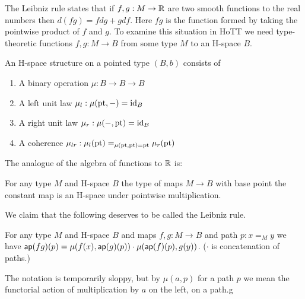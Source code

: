 \documentclass[12pt]{article}
\begin{document}
The Leibniz rule states that if \( f, g:M\to \mathbb{R} \) are two smooth functions to the real numbers then \( d(fg) = fdg + gdf \). Here \( fg \) is the function formed by taking the pointwise product of \( f \) and \( g \). To examine this situation in HoTT we need type-theoretic functions \( f, g:M\to B \) from some type \( M \) to an H-space \( B \).

\begin{mydef}
An H-space structure on a pointed type \( (B,b) \) consists of
\begin{enumerate}
\item A binary operation \( \mu:B\to B\to B \)
\item A left unit law \( \mu_l:\mu(\mathrm{pt},-)=\text{id}_B \)
\item A right unit law \( \mu_r:\mu(-,\mathrm{pt})=\text{id}_B \)
\item A coherence \( \mu_{lr}:\mu_l(\mathrm{pt})=_{\mu(\mathrm{pt},\mathrm{pt})=\mathrm{pt}}\mu_r(\mathrm{pt}) \)
\end{enumerate}
\end{mydef}

The analogue of the algebra of functions to \( \mathbb{R} \) is:
\begin{myprop}
For any type \( M \) and H-space \( B \) the type of maps \( M\to B \) with base point the constant map is an H-space under pointwise multiplication.
\end{myprop}

We claim that the following deserves to be called the Leibniz rule.

\begin{mylemma}
For any type \( M \) and H-space \( B \) and maps \( f,g:M\to B \) and path \( p:x=_M y \) we have \( \textsf{ap}(fg)(p)=\mu(f(x),\textsf{ap}(g)(p)) \cdot \mu(\textsf{ap}(f)(p),g(y)) \). (\( \cdot \) is concatenation of paths.)
\end{mylemma}

The notation is temporarily sloppy, but by \( \mu(a, p) \) for a path \( p \) we mean the functorial action of multiplication by \( a \) on the left, on a path.g

\end{document}
